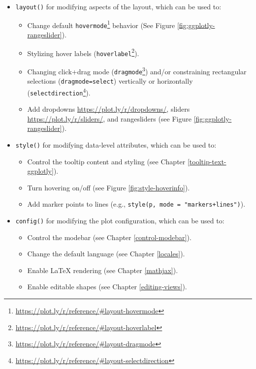 \documentclass[
  12pt,
]{krantz}
\providecommand{\tightlist}{%
  \setlength{\itemsep}{0pt}\setlength{\parskip}{0pt}}
\renewcommand{\href}[2]{#2\footnote{\url{#1}}}
\begin{document}
\begin{itemize}
\tightlist
\item
  \texttt{layout()} for modifying aspects of the layout, which can be used to:

  \begin{itemize}
  \tightlist
  \item
    Change default \href{https://plot.ly/r/reference/\#layout-hovermode}{\texttt{hovermode}} behavior (See Figure \ref{fig:ggplotly-rangeslider}).
  \item
    Stylizing hover labels (\href{https://plot.ly/r/reference/\#layout-hoverlabel}{\texttt{hoverlabel}}).
  \item
    Changing click+drag mode (\href{https://plot.ly/r/reference/\#layout-dragmode}{\texttt{dragmode}}) and/or constraining rectangular selections (\texttt{dragmode=\textquotesingle{}select\textquotesingle{}}) vertically or horizontally (\href{https://plot.ly/r/reference/\#layout-selectdirection}{\texttt{selectdirection}}).
  \item
    Add dropdowns \url{https://plot.ly/r/dropdowns/}, sliders \url{https://plot.ly/r/sliders/}, and rangesliders (see Figure \ref{fig:ggplotly-rangeslider}).
  \end{itemize}
\item
  \texttt{style()} for modifying data-level attributes, which can be used to:

  \begin{itemize}
  \tightlist
  \item
    Control the tooltip content and styling (see Chapter \ref{tooltip-text-ggplotly}).
  \item
    Turn hovering on/off (see Figure \ref{fig:style-hoverinfo}).
  \item
    Add marker points to lines (e.g., \texttt{style(p,\ mode\ =\ "markers+lines")}).
  \end{itemize}
\item
  \texttt{config()} for modifying the plot configuration, which can be used to:

  \begin{itemize}
  \tightlist
  \item
    Control the modebar (see Chapter \ref{control-modebar}).
  \item
    Change the default language (see Chapter \ref{locales}).
  \item
    Enable LaTeX rendering (see Chapter \ref{mathjax}).
  \item
    Enable editable shapes (see Chapter \ref{editing-views}).
  \end{itemize}
\end{itemize}
\end{document}
